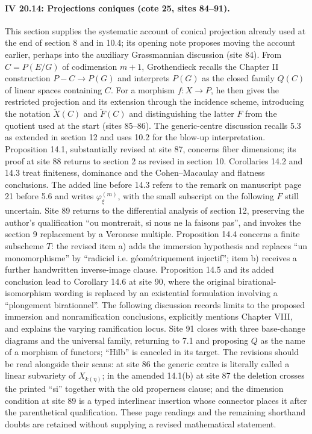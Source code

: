 \documentclass[10pt,a4paper]{article}
\begin{document}
\par{}
\paragraph{IV 20.14: Projections coniques (cote 25, sites 84--91).}
This section supplies the systematic account of conical projection already used at the end of section 8 and in 10.4; its opening note proposes moving the account earlier, perhaps into the auxiliary Grassmannian discussion (site 84). From $C=P(E/G)$ of codimension $m+1$, Grothendieck recalls the Chapter II construction $P-C\to P(G)$ and interprets $P(G)$ as the closed family $Q(C)$ of linear spaces containing $C$. For a morphism $f:X\to P$, he then gives the restricted projection and its extension through the incidence scheme, introducing the notation $\widetilde X(C)$ and $\widetilde F(C)$ and distinguishing the latter $F$ from the quotient used at the start (sites 85--86). The generic-centre discussion recalls 5.3 as extended in section 12 and uses 10.2 for the blow-up interpretation. Proposition 14.1, substantially revised at site 87, concerns fiber dimensions; its proof at site 88 returns to section 2 as revised in section 10. Corollaries 14.2 and 14.3 treat finiteness, dominance and the Cohen--Macaulay and flatness conclusions. The added line before 14.3 refers to the remark on manuscript page 21 before 5.6 and writes $\varphi^{(m)}_\xi$, with the small subscript on the following $F$ still uncertain. Site 89 returns to the differential analysis of section 12, preserving the author's qualification ``ou montrerait, si nous ne la faisons pas'', and invokes the section 9 replacement by a Veronese multiple. Proposition 14.4 concerns a finite subscheme $T$: the revised item a) adds the immersion hypothesis and replaces ``un monomorphisme'' by ``radiciel i.e. géométriquement injectif''; item b) receives a further handwritten inverse-image clause. Proposition 14.5 and its added conclusion lead to Corollary 14.6 at site 90, where the original birational-isomorphism wording is replaced by an existential formulation involving a ``plongement birationnel''. The following discussion records limits to the proposed immersion and nonramification conclusions, explicitly mentions Chapter VIII, and explains the varying ramification locus. Site 91 closes with three base-change diagrams and the universal family, returning to 7.1 and proposing $Q$ as the name of a morphism of functors; ``Hilb'' is canceled in its target. The revisions should be read alongside their scans: at site 86 the generic centre is literally called a linear subvariety of $X_{k(\eta)}$; in the amended 14.1(b) at site 87 the deletion crosses the printed ``si'' together with the old properness clause; and the dimension condition at site 89 is a typed interlinear insertion whose connector places it after the parenthetical qualification. These page readings and the remaining shorthand doubts are retained without supplying a revised mathematical statement.
\par{}
\end{document}
